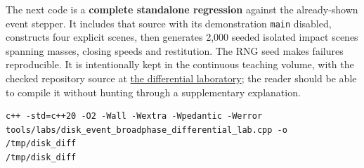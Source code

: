 The next code is a \textbf{complete standalone regression} against the already-shown event stepper. It includes that source with its demonstration \texttt{main} disabled, constructs four explicit scenes, then generates 2,000 seeded isolated impact scenes spanning masses, closing speeds and restitution. The RNG seed makes failures reproducible. It is intentionally kept in the continuous teaching volume, with the checked repository source at \hyperref[source-file-352cdda3503a7fe277bf96f6]{the differential laboratory}; the reader should be able to compile it without hunting through a supplementary explanation.

\begin{verbatim}
c++ -std=c++20 -O2 -Wall -Wextra -Wpedantic -Werror tools/labs/disk_event_broadphase_differential_lab.cpp -o /tmp/disk_diff
/tmp/disk_diff
\end{verbatim}

